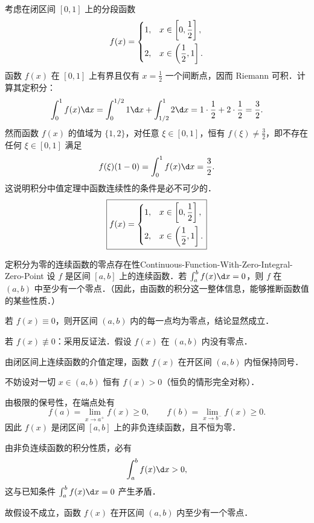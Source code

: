 \begin{solution}
    考虑在闭区间 $[0, 1]$ 上的分段函数
    \begin{equation}
        f(x) = \begin{dcases} 1, & x \in \left[0, \frac{1}{2}\right], \\ 2, & x \in \left(\frac{1}{2}, 1\right]. \end{dcases}
    \end{equation}
    函数 $f(x)$ 在 $[0, 1]$ 上有界且仅有 $x = \frac{1}{2}$ 一个间断点，因而 Riemann 可积．计算其定积分：
    \begin{equation}
        \int_0^1 f(x)\d x = \int_0^{1/2} 1\d x + \int_{1/2}^1 2\d x = 1 \cdot \frac{1}{2} + 2 \cdot \frac{1}{2} = \frac{3}{2}.
    \end{equation}
    然而函数 $f(x)$ 的值域为 $\{1, 2\}$，对任意 $\xi \in [0, 1]$，恒有 $f(\xi) \neq \frac{3}{2}$，即不存在任何 $\xi \in [0, 1]$ 满足
    \begin{equation}
        f(\xi)(1 - 0) = \int_0^1 f(x)\d x = \frac{3}{2}.
    \end{equation}
    这说明积分中值定理中函数连续性的条件是必不可少的．
    \begin{equation}
        \boxed{f(x) = \begin{dcases} 1, & x \in \left[0, \frac{1}{2}\right], \\ 2, & x \in \left(\frac{1}{2}, 1\right]. \end{dcases}}
    \end{equation}
\end{solution}

\begin{problem}{定积分为零的连续函数的零点存在性}{Continuous-Function-With-Zero-Integral-Zero-Point}
    设 $f$ 是区间 $[a, b]$ 上的连续函数．若 $\int_a^b f(x)\d x = 0$，则 $f$ 在 $(a, b)$ 中至少有一个零点．（因此，由函数的积分这一整体信息，能够推断函数值的某些性质．）
\end{problem}

\begin{myproof}
    若 $f(x) \equiv 0$，则开区间 $(a, b)$ 内的每一点均为零点，结论显然成立．

    若 $f(x) \not\equiv 0$：采用反证法．假设 $f(x)$ 在 $(a, b)$ 内没有零点．

    由闭区间上连续函数的介值定理，函数 $f(x)$ 在开区间 $(a, b)$ 内恒保持同号．

    不妨设对一切 $x \in (a, b)$ 恒有 $f(x) > 0$（恒负的情形完全对称）．

    由极限的保号性，在端点处有
    \begin{equation}
        f(a) = \lim_{x\to a^+} f(x) \geqslant 0, \qquad f(b) = \lim_{x\to b^-} f(x) \geqslant 0.
    \end{equation}
    因此 $f(x)$ 是闭区间 $[a, b]$ 上的非负连续函数，且不恒为零．

    由非负连续函数的积分性质，必有
    \begin{equation}
        \int_a^b f(x)\d x > 0,
    \end{equation}
    这与已知条件 $\int_a^b f(x)\d x = 0$ 产生矛盾．

    故假设不成立，函数 $f(x)$ 在开区间 $(a, b)$ 内至少有一个零点．
\end{myproof}

